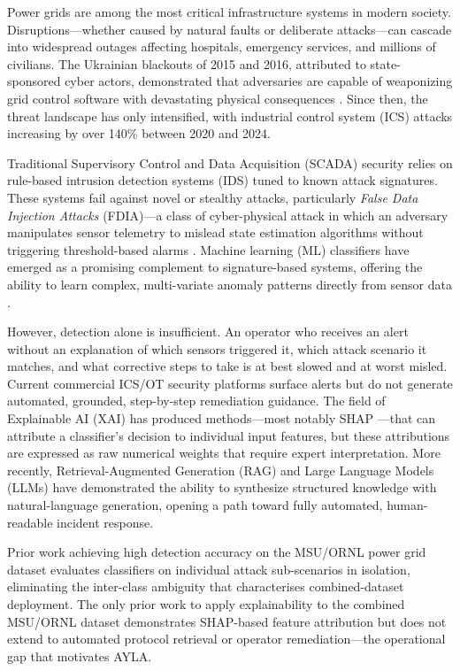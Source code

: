 \documentclass[twocolumn, 10pt, letterpaper]{article}
\begin{document}
Power grids are among the most critical infrastructure systems in modern society.
Disruptions---whether caused by natural faults or deliberate attacks---can cascade into
widespread outages affecting hospitals, emergency services, and millions of civilians.
The Ukrainian blackouts of 2015 and 2016, attributed to state-sponsored cyber actors,
demonstrated that adversaries are capable of weaponizing grid control software with
devastating physical consequences \cite{liang2017ukraine}.
Since then, the threat landscape has only intensified, with industrial control system
(ICS) attacks increasing by over 140\% between 2020 and 2024.

Traditional Supervisory Control and Data Acquisition (SCADA) security relies on
rule-based intrusion detection systems (IDS) tuned to known attack signatures.
These systems fail against novel or stealthy attacks, particularly \textit{False Data
Injection Attacks} (FDIA)---a class of cyber-physical attack in which an adversary
manipulates sensor telemetry to mislead state estimation algorithms without
triggering threshold-based alarms \cite{liu2011fdia}.
Machine learning (ML) classifiers have emerged as a promising complement to
signature-based systems, offering the ability to learn complex, multi-variate anomaly
patterns directly from sensor data \cite{ahmed2017scada}.

However, detection alone is insufficient.
An operator who receives an alert without an explanation of which sensors triggered
it, which attack scenario it matches, and what corrective steps to take is at best
slowed and at worst misled.
Current commercial ICS/OT security platforms surface alerts but do not generate
automated, grounded, step-by-step remediation guidance.
The field of Explainable AI (XAI) has produced methods---most notably SHAP
\cite{lundberg2017shap}---that can attribute a classifier's decision to individual
input features, but these attributions are expressed as raw numerical weights that
require expert interpretation.
More recently, Retrieval-Augmented Generation (RAG) \cite{lewis2020rag} and Large
Language Models (LLMs) have demonstrated the ability to synthesize structured
knowledge with natural-language generation, opening a path toward fully automated,
human-readable incident response.

Prior work achieving high detection accuracy on the MSU/ORNL power grid dataset
\cite{panthi2022ensemble,naeem2025deep,graphkan2025} evaluates classifiers on
individual attack sub-scenarios in isolation, eliminating the inter-class ambiguity
that characterises combined-dataset deployment.
The only prior work to apply explainability to the combined MSU/ORNL dataset
\cite{shapgrid2026} demonstrates SHAP-based feature attribution but does not extend
to automated protocol retrieval or operator remediation---the operational gap
that motivates AYLA.
\end{document}

